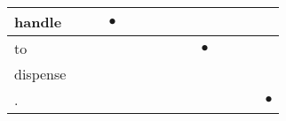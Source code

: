 \documentclass[landscape]{article}
\newcommand{\ssp}{\hspace{2pt}}
\newcommand{\mex}{\cellcolor{g}$\bullet$}
\begin{document}
\begin{tabular}{|l|p{10pt}|p{10pt}|p{10pt}|p{10pt}|p{10pt}|p{10pt}|p{10pt}|p{10pt}|p{10pt}|p{10pt}|p{10pt}|p{10pt}|p{10pt}|}
\hline
\ssp \cellcolor{ref2}handle \ssp&\hspace{2pt}&\hspace{2pt}&\hspace{2pt}\mex&\hspace{2pt}&\hspace{2pt}&\hspace{2pt}&\hspace{2pt}&\hspace{2pt}&\hspace{2pt}&\hspace{2pt}&\hspace{2pt}&\hspace{2pt}&\hspace{2pt}\\
\hline
\ssp \cellcolor{ref8}to \ssp&\hspace{2pt}&\hspace{2pt}&\hspace{2pt}&\hspace{2pt}&\hspace{2pt}&\hspace{2pt}&\hspace{2pt}&\hspace{2pt}&\hspace{2pt}\mex&\hspace{2pt}&\hspace{2pt}&\hspace{2pt}&\hspace{2pt}\\
\hline
\ssp dispense \ssp&\hspace{2pt}&\hspace{2pt}&\hspace{2pt}&\hspace{2pt}&\hspace{2pt}&\hspace{2pt}&\hspace{2pt}&\hspace{2pt}&\hspace{2pt}&\hspace{2pt}&\hspace{2pt}&\hspace{2pt}&\hspace{2pt}\\
\hline
\ssp \cellcolor{ref12}. \ssp&\hspace{2pt}&\hspace{2pt}&\hspace{2pt}&\hspace{2pt}&\hspace{2pt}&\hspace{2pt}&\hspace{2pt}&\hspace{2pt}&\hspace{2pt}&\hspace{2pt}&\hspace{2pt}&\hspace{2pt}&\hspace{2pt}\mex\\
\hline
\end{tabular}
\end{document}
